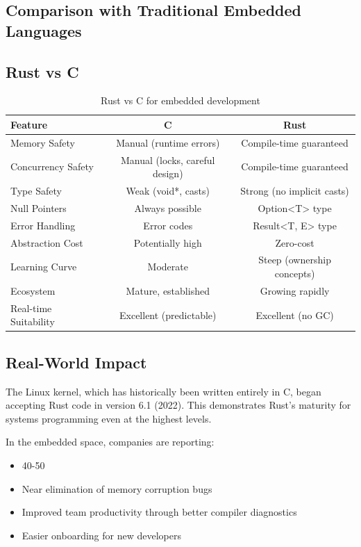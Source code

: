 \subsection{Comparison with Traditional Embedded Languages}
\label{sec:language-comparison}

\subsection{Rust vs C}

\begin{table}[H]
    \centering
    \begin{tabular}{l c c}
        \toprule
        \textbf{Feature} & \textbf{C} & \textbf{Rust} \\
        \midrule
        Memory Safety & Manual (runtime errors) & Compile-time guaranteed \\
        Concurrency Safety & Manual (locks, careful design) & Compile-time guaranteed \\
        Type Safety & Weak (void*, casts) & Strong (no implicit casts) \\
        Null Pointers & Always possible & Option<T> type \\
        Error Handling & Error codes & Result<T, E> type \\
        Abstraction Cost & Potentially high & Zero-cost \\
        Learning Curve & Moderate & Steep (ownership concepts) \\
        Ecosystem & Mature, established & Growing rapidly \\
        Real-time Suitability & Excellent (predictable) & Excellent (no GC) \\
        \bottomrule
    \end{tabular}
    \caption{Rust vs C for embedded development}
    \label{tab:rust-vs-c}
\end{table}

\subsection{Real-World Impact}

The Linux kernel, which has historically been written entirely in C, began accepting Rust code in version 6.1 (2022). This demonstrates Rust's maturity for systems programming even at the highest levels.

In the embedded space, companies are reporting:

\begin{itemize}
    \item 40-50%
    \item Near elimination of memory corruption bugs
    \item Improved team productivity through better compiler diagnostics
    \item Easier onboarding for new developers
\end{itemize}

